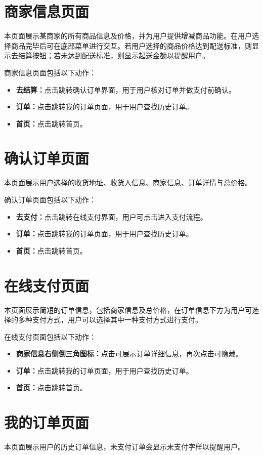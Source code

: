 \documentclass[UTF8]{ctexart}
\begin{document}
\section{商家信息页面}
本页面展示某商家的所有商品信息及价格，并为用户提供增减商品功能。在用户选择商品完毕后可在底部菜单进行交互。若用户选择的商品价格达到配送标准，则显示去结算按钮；若未达到配送标准，则显示起送金额以提醒用户。

商家信息页面包括以下动作：
\begin{itemize}
    \item \textbf{去结算：}点击跳转确认订单界面，用于用户核对订单并做支付前确认。
    \item \textbf{订单：}点击跳转我的订单页面，用于用户查找历史订单。
    \item \textbf{首页：}点击跳转首页。
\end{itemize}

\section{确认订单页面}
本页面展示用户选择的收货地址、收货人信息、商家信息、订单详情与总价格。

确认订单页面包括以下动作：
\begin{itemize}
    \item \textbf{去支付：}点击跳转在线支付界面，用户可点击进入支付流程。
    \item \textbf{订单：}点击跳转我的订单页面，用于用户查找历史订单。
    \item \textbf{首页：}点击跳转首页。
\end{itemize}

\section{在线支付页面}
本页面展示简短的订单信息，包括商家信息及总价格，在订单信息下方为用户可选择的多种支付方式，用户可以选择其中一种支付方式进行支付。

在线支付页面包括以下动作：
\begin{itemize}
    \item \textbf{商家信息右侧倒三角图标：}点击可展示订单详细信息，再次点击可隐藏。
    \item \textbf{订单：}点击跳转我的订单页面，用于用户查找历史订单。
    \item \textbf{首页：}点击跳转首页。
\end{itemize}

\section{我的订单页面}
本页面展示用户的历史订单信息，未支付订单会显示未支付字样以提醒用户。
\end{document}
